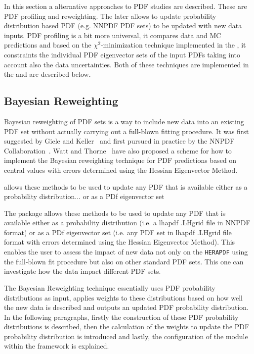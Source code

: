 In this section a alternative approaches to PDF studies are described. These are PDF profiling and reweighting. The later allows to update probability distribution based PDF (e.g. NNPDF PDF sets) to be updated with new data inputs. PDF profiling is a bit more universal, it compares data and MC predictions and based on the $\chi^2$-minimization technique implemented in the \fitter, it constraints the individual PDF eigenvector sets of the input PDFs taking into account also the data uncertainties. Both of these techniques are implemented in the \fitter and are described below.


\subsection{Bayesian Reweighting}

Bayesian reweighting of PDF sets is a way to include new data into an existing PDF set without actually carrying out a full-blown fitting procedure. 
It was first suggested by Giele and Keller~\cite{Giele:1998gw} and first pursued in practice by the NNPDF Collaboration~\cite{Ball:2011gg,Ball:2010gb}. 
Watt and Thorne~\cite{Watt:2012tq} have also proposed a scheme for how to implement the Bayesian reweighting technique for PDF predictions based on central values with errors determined using the Hessian Eigenvector Method. 

allows these methods to be used to update any PDF that is available either as a probability distribution... or as a PDf eigenvector set

The \fitter package allows these methods to be used to update any PDF that is available either as a probability distribution
(i.e. a lhapdf .LHgrid file in NNPDF format) or as a PDf eigenvector set 
(i.e. any PDF set in lhapdf .LHgrid file format with errors determined using the Hessian Eigenvector Method).
This enables the user to assess the impact of new data not only on the {\tt HERAPDF} using the full-blown fit procedure 
but also on other standard PDF sets. This one can investigate how the data impact different PDF sets.

The Bayesian Reweighting technique essentially uses PDF probability distributions as input, applies weights to these distributions based on how well the new data is described and outputs an updated PDF probability distribution. In the following paragraphs, firstly the construction of these PDF probability distributions is described, then the calculation of the weights to update the PDF probability distribution is introduced and lastly, the configuration of the module within the \fitter framework is explained.

